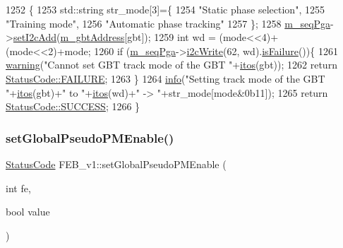 \begin{DoxyCode}
1252                                                    \{
1253   std::string str\_mode[3]=\{
1254     \textcolor{stringliteral}{"Static phase selection"},
1255     \textcolor{stringliteral}{"Training mode"},
1256     \textcolor{stringliteral}{"Automatic phase tracking"}
1257   \};
1258   \hyperlink{classFEB__v1_a6c7804ac86796f233a8393043adf2e77}{m\_seqPga}->\hyperlink{classSeqPGA_a4ef334e4d2cb417b49033dce951728cd}{setI2cAdd}(\hyperlink{classFEB__v1_ac625855df976f16694178f1a4c0eef1e}{m\_gbtAddress}[gbt]);
1259   \textcolor{keywordtype}{int} wd = (mode<<4)+(mode<<2)+mode;
1260   \textcolor{keywordflow}{if} (\hyperlink{classFEB__v1_a6c7804ac86796f233a8393043adf2e77}{m\_seqPga}->\hyperlink{classSeqPGA_a429076ca3a4ece94182bd95c623bb9d0}{i2cWrite}(62, wd).\hyperlink{classStatusCode_a5dd22dc6eb2c52fc4cabc58f6dea2eb7}{isFailure}())\{
1261     \hyperlink{classObject_a65cd4fda577711660821fd2cd5a3b4c9}{warning}(\textcolor{stringliteral}{"Cannot set GBT track mode of the GBT "}+\hyperlink{Tools_8h_af330027dbdafb9a30768b3613c553e60}{itos}(gbt));
1262     \textcolor{keywordflow}{return} \hyperlink{classStatusCode_a6f565cbeadc76d14c72f047e5e85eb4ba3da73d4c469762eb9d3c960368252b26}{StatusCode::FAILURE};
1263   \}
1264   \hyperlink{classObject_a644fd329ea4cb85f54fa6846484b84a8}{info}(\textcolor{stringliteral}{"Setting track mode of the GBT "}+\hyperlink{Tools_8h_af330027dbdafb9a30768b3613c553e60}{itos}(gbt)+\textcolor{stringliteral}{" to "}+\hyperlink{Tools_8h_af330027dbdafb9a30768b3613c553e60}{itos}(wd)+\textcolor{stringliteral}{" -> "}+str\_mode[mode&0b11]);
1265   \textcolor{keywordflow}{return} \hyperlink{classStatusCode_a6f565cbeadc76d14c72f047e5e85eb4badd0da38d3ba0d922efd1f4619bc37ad8}{StatusCode::SUCCESS};
1266 \}
\end{DoxyCode}
\mbox{\label{classFEB__v1_adce2d9c70235f4226ab59aea3dc5953c}} 
\subsubsection{\texorpdfstring{set\+Global\+Pseudo\+P\+M\+Enable()}{setGlobalPseudoPMEnable()}}
{\footnotesize\ttfamily \hyperlink{classStatusCode}{Status\+Code} F\+E\+B\+\_\+v1\+::set\+Global\+Pseudo\+P\+M\+Enable (\begin{DoxyParamCaption}\item[{int}]{fe,  }\item[{bool}]{value }\end{DoxyParamCaption})}



